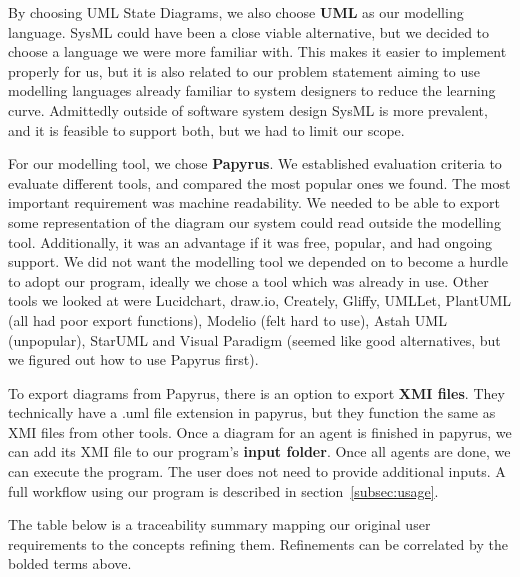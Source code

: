 By choosing UML State Diagrams, we also choose \textbf{UML} as our modelling language.
SysML could have been a close viable alternative, but we decided to choose a language we were more familiar with.
This makes it easier to implement properly for us,
but it is also related to our problem statement aiming to use modelling languages already familiar to system designers to reduce the learning curve.
Admittedly outside of software system design SysML is more prevalent, and it is feasible to support both, but we had to limit our scope.

For our modelling tool, we chose \textbf{Papyrus}.
We established evaluation criteria to evaluate different tools, and compared the most popular ones we found.
The most important requirement was machine readability.
We needed to be able to export some representation of the diagram our system could read outside the modelling tool.
Additionally, it was an advantage if it was free, popular, and had ongoing support.
We did not want the modelling tool we depended on to become a hurdle to adopt our program,
ideally we chose a tool which was already in use.
Other tools we looked at were Lucidchart, draw.io, Creately, Gliffy, UMLLet, PlantUML (all had poor export functions),
Modelio (felt hard to use), Astah UML (unpopular),
StarUML and Visual Paradigm (seemed like good alternatives, but we figured out how to use Papyrus first).

To export diagrams from Papyrus, there is an option to export \textbf{XMI files}.
They technically have a .uml file extension in papyrus, but they function the same as XMI files from other tools.
Once a diagram for an agent is finished in papyrus, we can add its XMI file to our program's \textbf{input folder}.
Once all agents are done, we can execute the program.
The user does not need to provide additional inputs.
A full workflow using our program is described in section~\ref{subsec:usage}.

The table below is a traceability summary mapping our original user requirements to the concepts refining them.
Refinements can be correlated by the bolded terms above.

